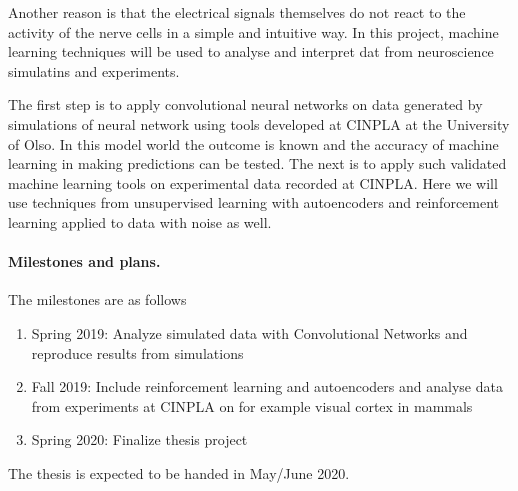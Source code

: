 \documentclass[%
oneside,                 %
final,                   %
10pt]{article}
\begin{document}
Another reason is that the electrical signals themselves do not react
to the activity of the nerve cells in a simple and intuitive way.  In
this project, machine learning techniques will be used to analyse and
interpret dat from neuroscience simulatins and experiments.

The first step is to apply convolutional neural networks on data
generated by simulations of neural network using tools developed at
CINPLA at the University of Olso. In this model world the outcome is
known and the accuracy of machine learning in making predictions can
be tested. The next is to apply such validated machine learning tools
on experimental data recorded at CINPLA.  Here we will use techniques
from unsupervised learning with autoencoders and reinforcement
learning applied to data with noise as well.

\paragraph{Milestones and plans.}
The milestones are as follows
\begin{enumerate}
\item Spring 2019: Analyze simulated data with Convolutional Networks and reproduce results from simulations

\item Fall 2019: Include reinforcement learning and autoencoders and analyse data from experiments at CINPLA on for example visual cortex in mammals

\item Spring 2020: Finalize thesis project
\end{enumerate}

\noindent
The thesis is expected to be handed in May/June  2020.


\end{document}
